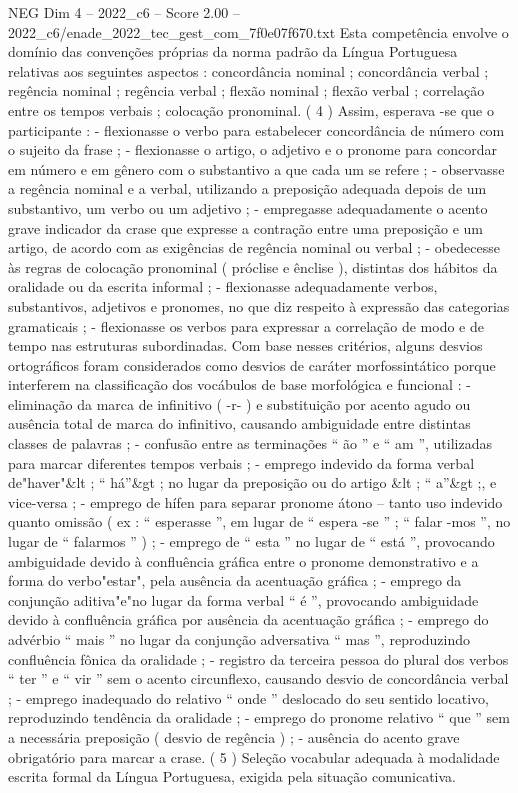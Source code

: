 \begin{textsample}{NEG Dim 4 – 2022\_c6 – Score 2.00 – 2022\_c6/enade\_2022\_tec\_gest\_com\_7f0e07f670.txt}
Esta competência envolve o domínio das convenções próprias da norma padrão da Língua Portuguesa relativas aos seguintes aspectos : concordância nominal ; concordância verbal ; regência nominal ; regência verbal ; flexão nominal ; flexão verbal ; correlação entre os tempos verbais ; colocação pronominal. ( 4 ) Assim, esperava -se que o participante : - flexionasse o verbo para estabelecer concordância de número com o sujeito da frase ; - flexionasse o artigo, o adjetivo e o pronome para concordar em número e em gênero com o substantivo a que cada um se refere ; - observasse a regência nominal e a verbal, utilizando a preposição adequada depois de um substantivo, um verbo ou um adjetivo ; - empregasse adequadamente o acento grave indicador da crase que expresse a contração entre uma preposição e um artigo, de acordo com as exigências de regência nominal ou verbal ; - obedecesse às regras de colocação pronominal ( próclise e ênclise ), distintas dos hábitos da oralidade ou da escrita informal ; - flexionasse adequadamente verbos, substantivos, adjetivos e pronomes, no que diz respeito à expressão das categorias gramaticais ; - flexionasse os verbos para expressar a correlação de modo e de tempo nas estruturas subordinadas.
Com base nesses critérios, alguns desvios ortográficos foram considerados como desvios de caráter morfossintático porque interferem na classificação dos vocábulos de base morfológica e funcional : - eliminação da marca de infinitivo ( -r- ) e substituição por acento agudo ou ausência total de marca do infinitivo, causando ambiguidade entre distintas classes de palavras ; - confusão entre as terminações “ ão ” e “ am ”, utilizadas para marcar diferentes tempos verbais ; - emprego indevido da forma verbal de"haver"\&lt ; “ há”\&gt ; no lugar da preposição ou do artigo \&lt ; “ a”\&gt ;, e vice-versa ; - emprego de hífen para separar pronome átono – tanto uso indevido quanto omissão ( ex : “ esperasse ”, em lugar de “ espera -se ” ; “ falar -mos ”, no lugar de “ falarmos ” ) ; - emprego de “ esta ” no lugar de “ está ”, provocando ambiguidade devido à confluência gráfica entre o pronome demonstrativo e a forma do verbo"estar", pela ausência da acentuação gráfica ; - emprego da conjunção aditiva"e"no lugar da forma verbal “ é ”, provocando ambiguidade devido à confluência gráfica por ausência da acentuação gráfica ; - emprego do advérbio “ mais ” no lugar da conjunção adversativa “ mas ”, reproduzindo confluência fônica da oralidade ; - registro da terceira pessoa do plural dos verbos “ ter ” e “ vir ” sem o acento circunflexo, causando desvio de concordância verbal ; - emprego inadequado do relativo “ onde ” deslocado do seu sentido locativo, reproduzindo tendência da oralidade ; - emprego do pronome relativo “ que ” sem a necessária preposição ( desvio de regência ) ; - ausência do acento grave obrigatório para marcar a crase. ( 5 ) Seleção vocabular adequada à modalidade escrita formal da Língua Portuguesa, exigida pela situação comunicativa.

\end{textsample}
